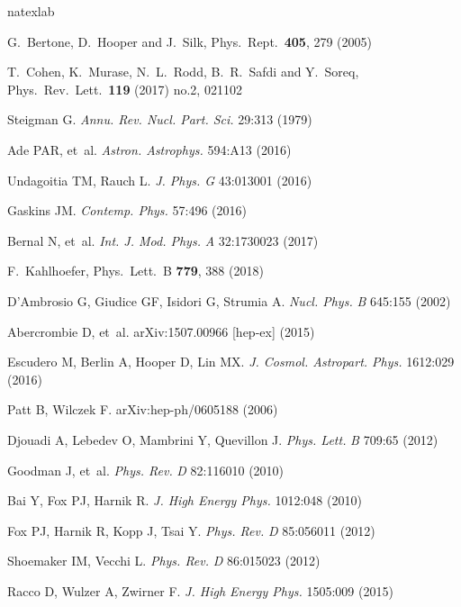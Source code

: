 \documentclass{ar-1col}
\begin{document}
\begin{thebibliography}{175}
\expandafter\ifx\csname
natexlab\endcsname\relax\def\natexlab#1{#1}\fi

G.~Bertone, D.~Hooper and J.~Silk, Phys.\ Rept.\  {\bf 405}, 279 (2005) 

  T.~Cohen, K.~Murase, N.~L.~Rodd, B.~R.~Safdi and Y.~Soreq, Phys.\ Rev.\ Lett.\  {\bf 119} (2017) no.2,  021102
  
Steigman G. \textit{Annu. Rev. Nucl. Part. Sci.} 29:313 (1979)

Ade PAR, et~al. \textit{Astron. Astrophys.} 594:A13 (2016)

Undagoitia TM, Rauch L. \textit{J. Phys. G}
43:013001 (2016)

Gaskins JM. \textit{Contemp. Phys.} 57:496 (2016)

Bernal N, et~al. \textit{Int. J. Mod. Phys.} \textit{A} 32:1730023 (2017)

  F.~Kahlhoefer, Phys.\ Lett.\ B {\bf 779}, 388 (2018)
  
D'Ambrosio G, Giudice GF, Isidori G, Strumia A. \textit{Nucl.
Phys.} \textit{B} 645:155 (2002)

Abercrombie D, et~al. arXiv:1507.00966 [hep-ex] (2015)

Escudero M, Berlin A, Hooper D, Lin MX. \textit{J. Cosmol. Astropart. Phys.} 1612:029
(2016)

Patt B, Wilczek F. arXiv:hep-ph/0605188 (2006)

Djouadi A, Lebedev O, Mambrini Y, Quevillon J. \textit{Phys.
Lett.} \textit{B} 709:65 (2012)

Goodman J, et~al. \textit{Phys. Rev.} \textit{D} 82:116010 (2010)

Bai Y, Fox PJ, Harnik R. \textit{J. High Energy Phys.} 1012:048 (2010)

Fox PJ, Harnik R, Kopp J, Tsai Y. \textit{Phys. Rev.} \textit{D} 85:056011
(2012)

Shoemaker IM, Vecchi L. \textit{Phys. Rev.} \textit{D} 86:015023 (2012)

Racco D, Wulzer A, Zwirner F. \textit{J. High Energy Phys.} 1505:009 (2015)


\end{thebibliography}
\end{document}
